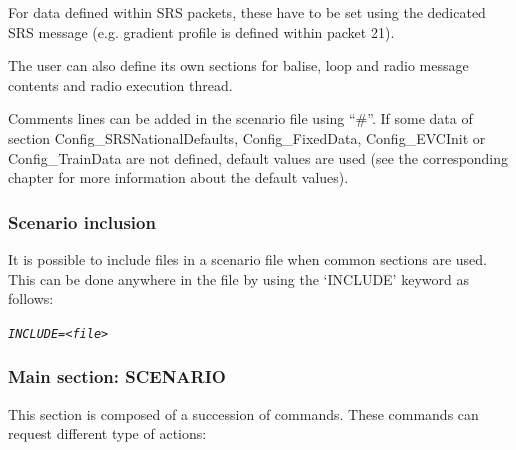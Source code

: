 \documentclass{template/openetcs}
\begin{document}
For data defined within SRS packets, these have to be set using the dedicated SRS message (e.g. gradient profile is defined within packet 21).

The user can also define its own sections for balise, loop and radio message contents and radio execution thread.

Comments lines can be added in the scenario file using “\#”.
If some data of section Config\_SRSNationalDefaults, Config\_FixedData, Config\_EVCInit or Config\_TrainData are not defined, default values are used (see the corresponding chapter for more information about the default values).

\subsubsection{Scenario inclusion}

It is possible to include files in a scenario file when common sections are used. This can be done anywhere in the file by using the ‘INCLUDE’ keyword as follows: 

\emph{\texttt{INCLUDE=<file>}}

\subsubsection{Main section: SCENARIO}

This section is composed of a succession of commands. These commands can request different type of actions:
\end{document}
